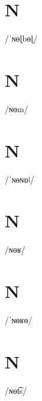 \documentclass[10pt,a4paper,twoside]{book}
\begin{document}
\section*{N}

\begin{multicols}{3}
 {/ˈɴɵɭbɵɭ/} {}
\end{multicols}

\section*{N}

\begin{multicols}{3}
 {/ɴɵm/} {}
\end{multicols}

\section*{N}

\begin{multicols}{3}
 {/ˈɴɵɴɒǀ/} {}
\end{multicols}

\section*{N}

\begin{multicols}{3}
 {/ɴɵʁ/} {}
\end{multicols}

\section*{N}

\begin{multicols}{3}
 {/ˈɴɵʁɵ/} {}
\end{multicols}

\section*{N}

\begin{multicols}{3}
 {/ɴɵt͡s/} {}
\end{multicols}
\end{document}
